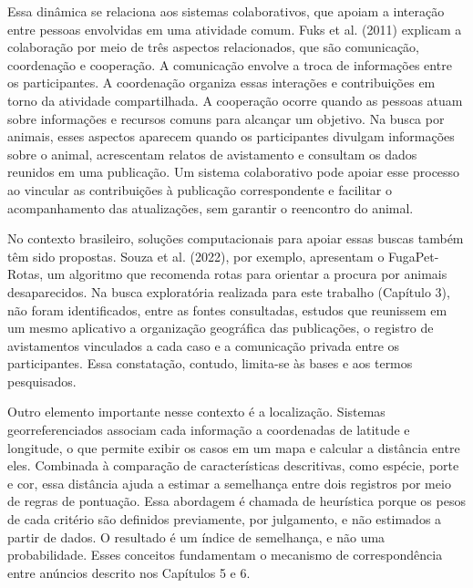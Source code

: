 Essa dinâmica se relaciona aos sistemas colaborativos, que apoiam a interação entre pessoas envolvidas em uma atividade comum. Fuks et al. (2011) explicam a colaboração por meio de três aspectos relacionados, que são comunicação, coordenação e cooperação. A comunicação envolve a troca de informações entre os participantes. A coordenação organiza essas interações e contribuições em torno da atividade compartilhada. A cooperação ocorre quando as pessoas atuam sobre informações e recursos comuns para alcançar um objetivo. Na busca por animais, esses aspectos aparecem quando os participantes divulgam informações sobre o animal, acrescentam relatos de avistamento e consultam os dados reunidos em uma publicação. Um sistema colaborativo pode apoiar esse processo ao vincular as contribuições à publicação correspondente e facilitar o acompanhamento das atualizações, sem garantir o reencontro do animal.

No contexto brasileiro, soluções computacionais para apoiar essas buscas também têm sido propostas. Souza et al. (2022), por exemplo, apresentam o FugaPet-Rotas, um algoritmo que recomenda rotas para orientar a procura por animais desaparecidos. Na busca exploratória realizada para este trabalho (Capítulo 3), não foram identificados, entre as fontes consultadas, estudos que reunissem em um mesmo aplicativo a organização geográfica das publicações, o registro de avistamentos vinculados a cada caso e a comunicação privada entre os participantes. Essa constatação, contudo, limita-se às bases e aos termos pesquisados.

Outro elemento importante nesse contexto é a localização. Sistemas georreferenciados associam cada informação a coordenadas de latitude e longitude, o que permite exibir os casos em um mapa e calcular a distância entre eles. Combinada à comparação de características descritivas, como espécie, porte e cor, essa distância ajuda a estimar a semelhança entre dois registros por meio de regras de pontuação. Essa abordagem é chamada de heurística porque os pesos de cada critério são definidos previamente, por julgamento, e não estimados a partir de dados. O resultado é um índice de semelhança, e não uma probabilidade. Esses conceitos fundamentam o mecanismo de correspondência entre anúncios descrito nos Capítulos 5 e 6.

